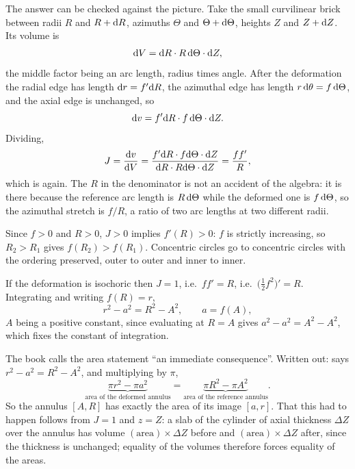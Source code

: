 \begin{remark}\label{rem:J376}
The answer can be checked against the picture. Take the small curvilinear
brick between radii $R$ and $R+\mathrm{d} R$, azimuths $\Theta$ and
$\Theta+\mathrm{d}\Theta$, heights $Z$ and $Z+\mathrm{d} Z$. Its volume is
\[
   \mathrm{d} V=\mathrm{d} R\cdot R\,\mathrm{d}\Theta\cdot\mathrm{d} Z ,
\]
the middle factor being an arc length, radius times angle. After the
deformation the radial edge has length $\mathrm{d} r=f'\mathrm{d} R$, the azimuthal edge
has length $r\,\mathrm{d}\theta=f\,\mathrm{d}\Theta$, and the axial edge is unchanged, so
\[
   \mathrm{d} v=f'\mathrm{d} R\cdot f\,\mathrm{d}\Theta\cdot\mathrm{d} Z .
\]
Dividing,
\[
   J=\frac{\mathrm{d} v}{\mathrm{d} V}=\frac{f'\mathrm{d} R\cdot f\mathrm{d}\Theta\cdot\mathrm{d} Z}
     {\mathrm{d} R\cdot R\mathrm{d}\Theta\cdot\mathrm{d} Z}=\frac{ff'}{R},
\]
which is  again. The $R$ in the denominator is not an accident of
the algebra: it is there because the reference arc length is $R\,\mathrm{d}\Theta$
while the deformed one is $f\,\mathrm{d}\Theta$, so the azimuthal stretch is
$f/R$, a ratio of two arc lengths at two different radii.
\end{remark}

Since $f>0$ and $R>0$, $J>0$ implies $f'(R)>0$: $f$ is strictly
increasing, so
$R_{2}>R_{1}$ gives $f(R_{2})>f(R_{1})$. Concentric circles go to
concentric circles with the ordering preserved, outer to outer and inner to
inner.

If the deformation is isochoric then $J=1$, i.e.\ $ff'=R$, i.e.\
$\big(\tfrac12f^{2}\big)'=R$. Integrating and writing $f(R)=r$,
\begin{equation}
   r^{2}-a^{2}=R^{2}-A^{2},\qquad a=f(A),
   \tag{3.77}\label{eq:3.77}
\end{equation}
$A$ being a positive constant, since evaluating at $R=A$ gives
$a^{2}-a^{2}=A^{2}-A^{2}$, which fixes the constant of integration.

The book calls the area statement ``an immediate consequence''. Written
out: \eqr{3.77} says $r^{2}-a^{2}=R^{2}-A^{2}$, and multiplying by $\pi$,
\[
   \underbrace{\pi r^{2}-\pi a^{2}}_{\text{area of the deformed annulus}}
   =\underbrace{\pi R^{2}-\pi A^{2}}
   _{\text{area of the reference annulus}} .
\]
So the annulus $[A,R]$ has exactly the area of its image $[a,r]$. That
this had to happen follows from $J=1$ and $z=Z$: a slab of the cylinder of
axial thickness $\Delta Z$ over the annulus has volume
$(\text{area})\times\Delta Z$ before and $(\text{area})\times\Delta Z$
after, since the thickness is unchanged; equality of the volumes therefore
forces equality of the areas.


